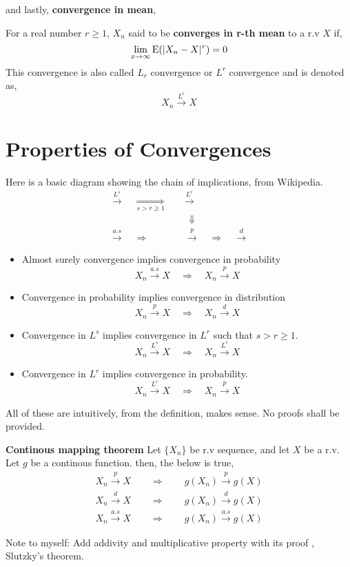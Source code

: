 and lastly, \textbf{convergence in mean},
\begin{definition}
    For  a real number $r \ge 1$, $X_n$ said to be \textbf{converges in r-th mean} to a r.v $X$ if, 
    \[\lim_{x \rightarrow \infty} {\operatorname{E}}(|X_n - X|^r) = 0 \]
    This convergence is also called $L_r$ convergence or $L^r$ convergence and is denoted as,
    \[ X_n  \stackrel{L^{r}}{\rightarrow} X \]
\end{definition}

\section{Properties of Convergences}
Here is a basic diagram showing the chain of implications, from Wikipedia.
\begin{align*}
    \stackrel{L^{s}}{\longrightarrow} \quad \underset{s>r\ge 1}{\Rightarrow} \quad &\stackrel{L^{r}}{\longrightarrow} \\
    & \ \  \Downarrow \\
    \stackrel{a.s}{\longrightarrow} \quad  \Rightarrow \quad &\stackrel{p}{\longrightarrow} \quad \Rightarrow \quad \stackrel{d}{\longrightarrow}
\end{align*}

\begin{itemize}
    \item Almost surely convergence implies convergence in probability
        \[ X_n \stackrel{a.s}{\longrightarrow} X\quad \Rightarrow \quad X_n \stackrel{p}{\longrightarrow} X\]
    \item Convergence in probability implies convergence in distribution
        \[ X_n \stackrel{p}{\longrightarrow} X \quad \Rightarrow  \quad X_n  \stackrel{d}{\longrightarrow} X\]
    \item Convergence in $L^s$ implies convergence in $L^r$ such that $s > r \ge 1$.
        \[ X_n \stackrel{L^s}{\longrightarrow} X \quad \Rightarrow \quad X_n \stackrel{L^r}{\longrightarrow} X\]
    \item Convergence in $L^r$ implies convergence in probability.
        \[ X_n \stackrel{L^r}{\longrightarrow} X \quad \Rightarrow \quad  X_n \stackrel{p}{\longrightarrow} X\]
\end{itemize}
All of these are intuitively, from the definition, makes sense. No proofs shall be provided.
\begin{theorem} \textbf{Continous mapping theorem} Let $\{ X_n \}$ be r.v sequence, and let $X$ be a r.v. Let $g$ be a continous function. then, the below is true,
    \begin{align*}
        X_n \stackrel{p}{\longrightarrow} X \qquad \Rightarrow \qquad g(X_n)\stackrel{p}{\longrightarrow} g(X) \\
        X_n \stackrel{d}{\longrightarrow} X \qquad \Rightarrow \qquad g(X_n) \stackrel{d}{\longrightarrow} g(X) \\
        X_n \stackrel{a.s}{\longrightarrow} X \qquad \Rightarrow \qquad g(X_n) \stackrel{a.s}{\longrightarrow} g(X)
    \end{align*}
\end{theorem}
Note to myself: Add addivity and multiplicative property with its proof , Slutzky's theorem.
